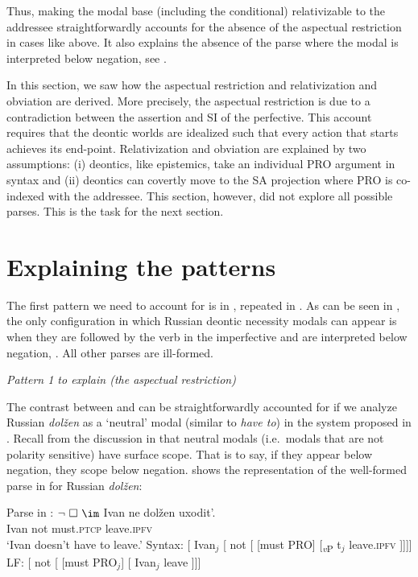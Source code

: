 \documentclass[output=paper,
modfonts,
newtxmath,colorlinks,citecolor=brown
]{langscibook}
\begin{document}
\noindent Thus, making the modal base (including the conditional) relativizable to the addressee straightforwardly accounts for the absence of the aspectual restriction in cases like above. It also explains the absence of the parse where the modal is interpreted below negation, see .
 
 In this section, we saw how the aspectual restriction and relativization and obviation are derived. More precisely, the aspectual restriction is due to a contradiction between the assertion and SI of the perfective. This account requires that the deontic worlds are idealized such that every action that starts achieves its end-point. Relativization and obviation are explained by two assumptions: (i) deontics, like epistemics, take an individual PRO argument  in syntax and (ii) deontics can covertly move to the SA projection where PRO is co-indexed with the addressee. This section, however, did not explore all possible parses. This is the task for the next section.
 
 \section{Explaining the patterns}\label{dar}
 The first pattern we need to account for is in , repeated in . As can be seen in , the only configuration in which Russian deontic necessity modals can appear is when they are followed by the verb in the imperfective and are interpreted below negation, . All other parses are ill-formed.
 
 	\ea \textit{Pattern 1 to explain (the aspectual restriction)}\label{arpattern}
	\ea[\ding{51}]{$\neg \ \Box$ \im \label{p1a}}
    \ex[\ding{55}]{$\,\Box\ \neg$ \im \label{p1b}}
    \ex[\ding{55}]{$\,\neg \ \Box$ \p \label{p1c}}
    \ex[\ding{55}]{$\,\Box\ \neg$ \p \label{p1d}}
    \z\z


\noindent  The contrast between  and  can be straightforwardly accounted for if we analyze Russian \textit{dolžen} as a `neutral' modal (similar to \textit{have to}) in the system proposed in \citet{iatzei13}. Recall from the discussion in   that neutral modals (i.e.\ modals that are not polarity sensitive) have surface scope. That is to say, if they appear below negation, they scope below negation.  shows the representation of the well-formed parse in  for Russian \textit{dolžen}:

	\ea Parse in :  $\neg\ \Box\ \im$ \label{detailsp1a}
    		\ea \gll Ivan ne dolžen uxodit'. \\
            	Ivan not must.\textsc{ptcp} leave.\textsc{ipfv}\\
                \glt `Ivan doesn't have to leave.'
			\ex Syntax: [ Ivan$_j$ [ not [ [must PRO] [\textsubscript{\textit{v}P} t$_j$ leave.\textsc{ipfv} ]]]]
            \ex LF: [ not [ [must PRO$_j$]  [ Ivan$_j$ leave ]]] \label{detailsp1ac}
		\z \z
\end{document}
